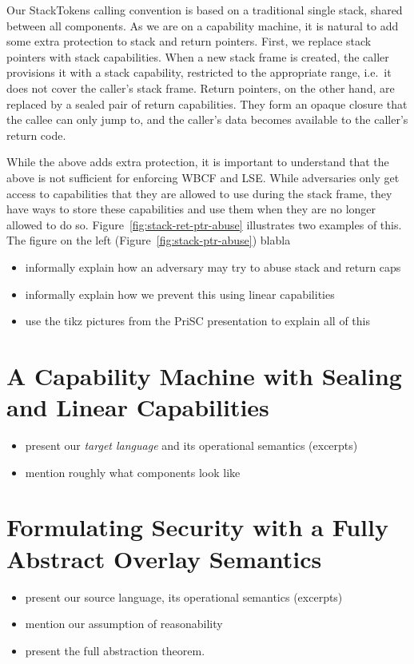 \documentclass[acmsmall,review,anonymous]{acmart}\settopmatter{printfolios=true,printccs=false,printacmref=false}
\begin{document}
Our StackTokens calling convention is based on a traditional single stack, shared between all components.
As we are on a capability machine, it is natural to add some extra protection to stack and return pointers.
First, we replace stack pointers with stack capabilities.
When a new stack frame is created, the caller provisions it with a stack capability, restricted to the appropriate range, i.e.\ it does not cover the caller's stack frame.
Return pointers, on the other hand, are replaced by a sealed pair of return capabilities.
They form an opaque closure that the callee can only jump to, and the caller's data becomes available to the caller's return code. 

While the above adds extra protection, it is important to understand that the above is not sufficient for enforcing WBCF and LSE.
While adversaries only get access to capabilities that they are allowed to use during the stack frame, they have ways to store these capabilities and use them when they are no longer allowed to do so.
Figure~\ref{fig:stack-ret-ptr-abuse} illustrates two examples of this.
The figure on the left (Figure~\ref{fig:stack-ptr-abuse}) blabla

\begin{itemize}
\item informally explain how an adversary may try to abuse stack and return caps
\item informally explain how we prevent this using linear capabilities
\item use the tikz pictures from the PriSC presentation to explain all of this
\end{itemize}
\section{A Capability Machine with Sealing and Linear Capabilities}
\begin{itemize}
\item present our \emph{target language} and its operational semantics (excerpts)
\item mention roughly what components look like
\end{itemize}
\section{Formulating Security with a Fully Abstract Overlay Semantics}
\begin{itemize}
\item present our source language, its operational semantics (excerpts)
\item mention our assumption of reasonability
\item present the full abstraction theorem.
\end{itemize}
\end{document}

